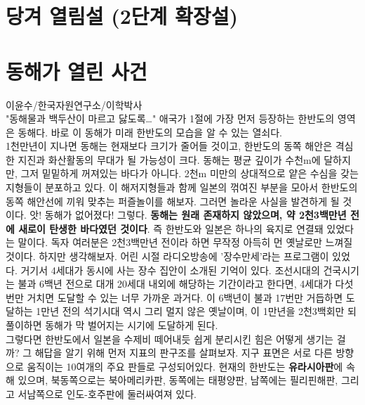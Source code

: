 \documentclass[12pt,a4paper]{book}
\newcommand{\SectionMargin}			{\newpage  \null \vskip 0cm}
\begin{document}
	\section{당겨 열림설 (2단계 확장설)}
	\null
 		














	\SectionMargin
	\section{동해가 열린 사건}

	이윤수/한국자원연구소/이학박사
	\\[-1.0em]




"동해물과 백두산이 마르고 닳도록…" 애국가 1절에 가장 먼저 등장하는 한반도의 영역은 동해다. 바로 이 동해가 미래 한반도의 모습을 알 수 있는 열쇠다. 
\\[-1.0em]

1천만년이 지나면 동해는 현재보다 크기가 줄어들 것이고, 한반도의 동쪽 해안은 격심한 지진과 화산활동의 무대가 될 가능성이 크다. 동해는 평균 깊이가 수천m에 달하지만, 그저 밑밑하게 꺼져있는 바다가 아니다. 2천m 미만의 상대적으로 얕은 수심을 갖는 지형들이 분포하고 있다. 이 해저지형들과 함께 일본의 꺾여진 부분을 모아서 한반도의 동쪽 해안선에 끼워 맞추는 퍼즐놀이를 해보자. 그러면 놀라운 사실을 발견하게 될 것이다.
앗! 동해가 없어졌다!
그렇다. \textbf{동해는 원래 존재하지 않았으며, 약 2천3백만년 전에 새로이 탄생한 바다였던 것이다}. 즉 한반도와 일본은 하나의 육지로 연결돼 있었다는 말이다. 
독자 여러분은 2천3백만년 전이라 하면 무작정 아득히 먼 옛날로만 느껴질 것이다. 하지만 생각해보자. 어린 시절 라디오방송에 '장수만세'라는 프로그램이 있었다. 거기서 4세대가 동시에 사는 장수 집안이 소개된 기억이 있다. 조선시대의 건국시기는 불과 6백년 전으로 대개 20세대 내외에 해당하는 기간이라고 한다면, 4세대가 다섯번만 거치면 도달할 수 있는 너무 가까운 과거다. 이 6백년이 불과 17번만 거듭하면 도달하는 1만년 전의 석기시대 역시 그리 멀지 않은 옛날이며, 이 1만년을 2천3백회만 되풀이하면 동해가 막 벌어지는 시기에 도달하게 된다.
\\[-1.0em]

그렇다면 한반도에서 일본을 수제비 떼어내듯 쉽게 분리시킨 힘은 어떻게 생기는 걸까? 그 해답을 알기 위해 먼저 지표의 판구조를 살펴보자. 
지구 표면은 서로 다른 방향으로 움직이는 10여개의 주요 판들로 구성되어있다. 
현재의 한반도는 \textbf{유라시아판}에 속해 있으며, 북동쪽으로는 북아메리카판, 동쪽에는 태평양판, 남쪽에는 필리핀해판, 
그리고 서남쪽으로 인도-호주판에 둘러싸여져 있다.
\\[-1.0em]
\end{document}
